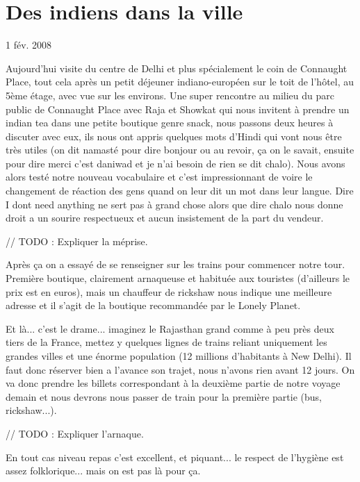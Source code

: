 \section{Des indiens dans la ville}

1 fév. 2008

\begin{multicols}{2}


Aujourd'hui visite du centre de Delhi et plus spécialement le coin de Connaught Place, tout cela après un petit déjeuner indiano-européen sur le toit de l’hôtel, au 5ème étage, avec vue sur les environs. Une super rencontre au milieu du parc public de Connaught Place avec Raja et Showkat qui nous invitent à prendre un indian tea dans une petite boutique genre snack, nous passons deux heures à discuter avec eux, ils nous ont appris quelques mots d’Hindi qui vont nous être très utiles (on dit namasté pour dire bonjour ou au revoir, ça on le savait, ensuite pour dire merci c’est daniwad et je n’ai besoin de rien se dit chalo). Nous avons alors testé notre nouveau vocabulaire et c’est impressionnant de voire le changement de réaction des gens quand on leur dit un mot dans leur langue. Dire I dont need anything ne sert pas à grand chose alors que dire chalo nous donne droit a un sourire respectueux et aucun insistement de la part du vendeur.

%
// TODO : Expliquer la méprise.

Après ça on a essayé de se renseigner sur les trains pour commencer notre tour.
Première boutique, clairement arnaqueuse et habituée aux touristes (d’ailleurs le prix est en euros), mais un chauffeur de rickshaw nous indique une meilleure adresse et il s’agit de la boutique recommandée par le Lonely Planet.

%
Et là... c’est le drame... imaginez le Rajasthan grand comme à peu près deux tiers de la France, mettez y quelques lignes de trains reliant uniquement les grandes villes et une énorme population (12 millions d'habitants à New Delhi). Il faut donc réserver bien a l’avance son trajet, nous n’avons rien avant 12 jours.
On va donc prendre les billets correspondant à la deuxième partie de notre voyage demain et nous devrons nous passer de train pour la première partie (bus, rickshaw...).

%
// TODO : Expliquer l'arnaque.

En tout cas niveau repas c’est excellent, et piquant... le respect de l’hygiène est assez folklorique... mais on est pas là pour ça.


\end{multicols}

\pagebreak
